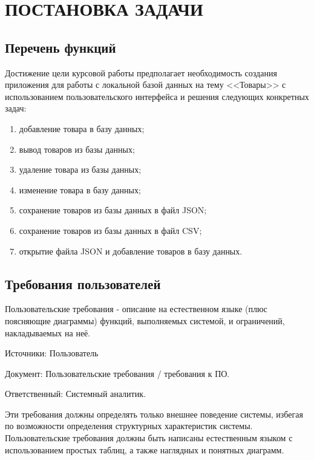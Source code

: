 \newpage

\section{ПОСТАНОВКА ЗАДАЧИ}


\subsection{Перечень функций}

Достижение цели курсовой работы предполагает необходимость создания приложения
для работы с локальной базой данных на тему <<Товары>> с использованием пользовательского
интерфейса и решения следующих конкретных задач:

\begin{enumerate}
    \item добавление товара в базу данных;
    \item вывод товаров из базы данных;
    \item удаление товара из базы данных;
    \item изменение товара в базу данных;
    \item сохранение товаров из базы данных в файл JSON;
    \item сохранение товаров из базы данных в файл CSV;
    \item открытие файла JSON и добавление товаров в базу данных.
\end{enumerate}


\subsection{Требования пользователей}

Пользовательские требования - описание на естественном языке (плюс поясняющие диаграммы) функций,
выполняемых системой, и ограничений, накладываемых на неё.

Источники: Пользователь

Документ: Пользовательские требования / требования к ПО.

Ответственный: Системный аналитик.

Эти требования должны определять только внешнее поведение системы,
избегая по возможности определения структурных характеристик системы.
Пользовательские требования должны быть написаны естественным языком с использованием
простых таблиц, а также наглядных и понятных диаграмм.

